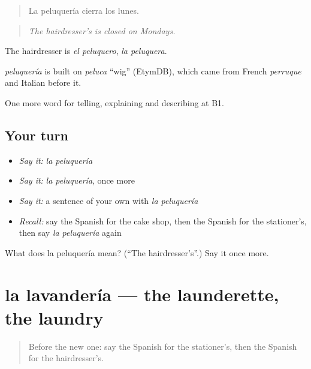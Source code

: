 \begin{quote}
La peluquería cierra los lunes.
\end{quote}

\begin{quote}
\emph{The hairdresser’s is closed on Mondays.}
\end{quote}

The hairdresser is \emph{el peluquero}, \emph{la peluquera}.

\begin{cousinweb}
\emph{peluquería} is built on \emph{peluca} \textquotedblleft{}wig\textquotedblright{} (EtymDB), which came from French \emph{perruque} and Italian before it.
\end{cousinweb}

\begin{grammarlens}[title={What you've built}]
One more word for telling, explaining and describing at B1.
\end{grammarlens}

\subsection*{Your turn}
\begin{itemize}
\raggedright
  \item \emph{Say it:} \emph{la peluquería}
  \item \emph{Say it:} \emph{la peluquería}, once more
  \item \emph{Say it:} a sentence of your own with \emph{la peluquería}
  \item \emph{Recall:} say the Spanish for the cake shop, then the Spanish for the stationer’s, then say \emph{la peluquería} again
\end{itemize}

\begin{tcolorbox}[breakable,colback=teal!4,colframe=teal!35!black,title={Before you move on}]
What does la peluquería mean? (\textquotedblleft{}The hairdresser’s\textquotedblright{}.) Say it once more.
\end{tcolorbox}
\section[la lavandería]{la lavandería — the launderette, the laundry}

\label{lesson:ES-C680-lavanderia}



\begin{quote}
Before the new one: say the Spanish for the stationer’s, then the Spanish for the hairdresser’s.
\end{quote}

